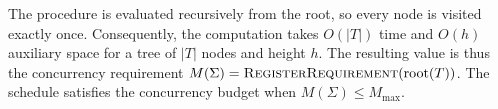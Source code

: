 \begin{algorithm}[ht]
\DontPrintSemicolon
{}
\caption{Minimum concurrency requirement of a tree-shaped schedule}
\label{alg:concurrency}
\end{algorithm}

The procedure is evaluated recursively from the root, so every node is visited exactly once. Consequently, the computation takes $O(|T|)$ time and $O(h)$ auxiliary space for a tree of $|T|$ nodes and height $h$. The resulting value is thus the concurrency requirement $M(\Sigma)=\textsc{RegisterRequirement}(\mathrm{root}(T))$. The schedule satisfies the concurrency budget when $M(\Sigma)\leq M_{\max}$.
